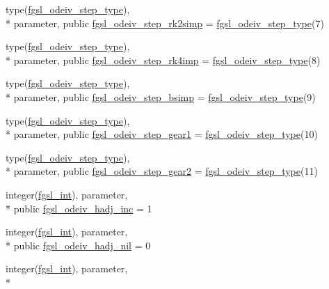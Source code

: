 \begin{DoxyCompactItemize}
\item 
type(\hyperlink{structfgsl_1_1fgsl__odeiv__step__type}{fgsl\-\_\-odeiv\-\_\-step\-\_\-type}), \\*
parameter, public \hyperlink{classfgsl_aba1fcb32d594f9bfa4e3d81e79ea8bff}{fgsl\-\_\-odeiv\-\_\-step\-\_\-rk2simp} = \hyperlink{structfgsl_1_1fgsl__odeiv__step__type}{fgsl\-\_\-odeiv\-\_\-step\-\_\-type}(7)
\item 
type(\hyperlink{structfgsl_1_1fgsl__odeiv__step__type}{fgsl\-\_\-odeiv\-\_\-step\-\_\-type}), \\*
parameter, public \hyperlink{classfgsl_ac3387d8df1b6ef380e912fcb3a852d2b}{fgsl\-\_\-odeiv\-\_\-step\-\_\-rk4imp} = \hyperlink{structfgsl_1_1fgsl__odeiv__step__type}{fgsl\-\_\-odeiv\-\_\-step\-\_\-type}(8)
\item 
type(\hyperlink{structfgsl_1_1fgsl__odeiv__step__type}{fgsl\-\_\-odeiv\-\_\-step\-\_\-type}), \\*
parameter, public \hyperlink{classfgsl_a64196b17cea8ee47b1386de3b5c3186e}{fgsl\-\_\-odeiv\-\_\-step\-\_\-bsimp} = \hyperlink{structfgsl_1_1fgsl__odeiv__step__type}{fgsl\-\_\-odeiv\-\_\-step\-\_\-type}(9)
\item 
type(\hyperlink{structfgsl_1_1fgsl__odeiv__step__type}{fgsl\-\_\-odeiv\-\_\-step\-\_\-type}), \\*
parameter, public \hyperlink{classfgsl_adc37c503cd35373720d2238db569e06a}{fgsl\-\_\-odeiv\-\_\-step\-\_\-gear1} = \hyperlink{structfgsl_1_1fgsl__odeiv__step__type}{fgsl\-\_\-odeiv\-\_\-step\-\_\-type}(10)
\item 
type(\hyperlink{structfgsl_1_1fgsl__odeiv__step__type}{fgsl\-\_\-odeiv\-\_\-step\-\_\-type}), \\*
parameter, public \hyperlink{classfgsl_ac5f41836ce32fc0099426b20ac83966c}{fgsl\-\_\-odeiv\-\_\-step\-\_\-gear2} = \hyperlink{structfgsl_1_1fgsl__odeiv__step__type}{fgsl\-\_\-odeiv\-\_\-step\-\_\-type}(11)
\item 
integer(\hyperlink{classfgsl_a222deda1d7a0c0e845ce4a683318efeb}{fgsl\-\_\-int}), parameter, \\*
public \hyperlink{classfgsl_a6af547b616e922df4bf6658c0199307d}{fgsl\-\_\-odeiv\-\_\-hadj\-\_\-inc} = 1
\item 
integer(\hyperlink{classfgsl_a222deda1d7a0c0e845ce4a683318efeb}{fgsl\-\_\-int}), parameter, \\*
public \hyperlink{classfgsl_ac1c1bce27a4a8cb6ac049b401b496372}{fgsl\-\_\-odeiv\-\_\-hadj\-\_\-nil} = 0
\item 
integer(\hyperlink{classfgsl_a222deda1d7a0c0e845ce4a683318efeb}{fgsl\-\_\-int}), parameter, \\*

\end{DoxyCompactItemize}
